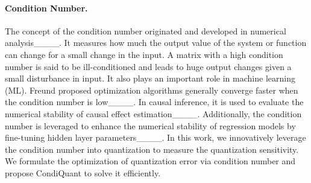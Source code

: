 \vspace{-4mm}
\paragraph{Condition Number.}
The concept of the condition number originated and developed in numerical analysis____.
It measures how much the output value of the system or function can change for a small change in the input.
A matrix with a high condition number is said to be ill-conditioned and leads to huge output changes given a small disturbance in input. 
It also plays an important role in machine learning (ML).
Freund proposed optimization algorithms generally converge faster when the condition number is low____.
In causal inference, it is used to evaluate the numerical stability of causal effect estimation____.
Additionally, the condition number is leveraged to enhance the numerical stability of regression models by fine-tuning hidden layer parameters____.
In this work, we innovatively leverage the condition number into quantization to measure the quantization sensitivity.
We formulate the optimization of quantization error via condition number and propose CondiQuant to solve it efficiently.

\vspace{-2mm}